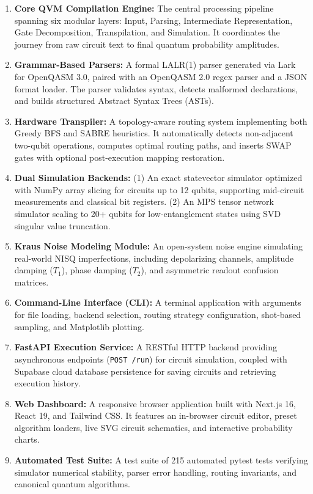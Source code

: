 \begin{enumerate}[leftmargin=*]
    \item \textbf{Core QVM Compilation Engine:} The central processing pipeline spanning six modular layers: Input, Parsing, Intermediate Representation, Gate Decomposition, Transpilation, and Simulation. It coordinates the journey from raw circuit text to final quantum probability amplitudes.
    \item \textbf{Grammar-Based Parsers:} A formal LALR(1) parser generated via Lark \cite{lark2023} for OpenQASM 3.0, paired with an OpenQASM 2.0 regex parser and a JSON format loader. The parser validates syntax, detects malformed declarations, and builds structured Abstract Syntax Trees (ASTs).
    \item \textbf{Hardware Transpiler:} A topology-aware routing system implementing both Greedy BFS and SABRE \cite{li2019sabre} heuristics. It automatically detects non-adjacent two-qubit operations, computes optimal routing paths, and inserts SWAP gates with optional post-execution mapping restoration.
    \item \textbf{Dual Simulation Backends:} (1) An exact statevector simulator optimized with NumPy array slicing for circuits up to 12 qubits, supporting mid-circuit measurements and classical bit registers. (2) An MPS tensor network simulator scaling to 20+ qubits for low-entanglement states using SVD singular value truncation.
    \item \textbf{Kraus Noise Modeling Module:} An open-system noise engine simulating real-world NISQ imperfections, including depolarizing channels, amplitude damping ($T_1$), phase damping ($T_2$), and asymmetric readout confusion matrices.
    \item \textbf{Command-Line Interface (CLI):} A terminal application with arguments for file loading, backend selection, routing strategy configuration, shot-based sampling, and Matplotlib plotting.
    \item \textbf{FastAPI Execution Service:} A RESTful HTTP backend providing asynchronous endpoints (\texttt{POST /run}) for circuit simulation, coupled with Supabase cloud database persistence for saving circuits and retrieving execution history.
    \item \textbf{Web Dashboard:} A responsive browser application built with Next.js 16, React 19, and Tailwind CSS. It features an in-browser circuit editor, preset algorithm loaders, live SVG circuit schematics, and interactive probability charts.
    \item \textbf{Automated Test Suite:} A test suite of 215 automated pytest tests verifying simulator numerical stability, parser error handling, routing invariants, and canonical quantum algorithms.

\end{enumerate}
